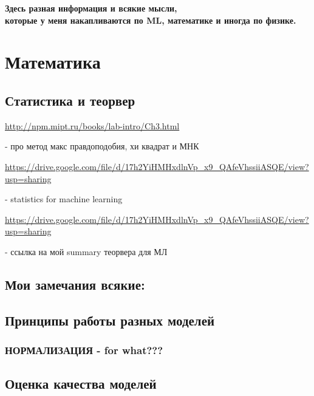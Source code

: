 \documentclass[11pt]{article}
\begin{document}
\begin{titlepage}
\begin{center}
\hspace{4.0cm}
\vfill

\huge\textbf{
    Здесь разная информация и всякие мысли,\\
    которые у меня накапливаются по ML, математике и 
    иногда по физике.
}

\vfill

\end{center}
\end{titlepage}

\tableofcontents

\newpage

\section{Математика}

\subsection{Статистика и теорвер}

\url{http://npm.mipt.ru/books/lab-intro/Ch3.html}

- про метод макс правдоподобия, хи квадрат и МНК

\url{https://drive.google.com/file/d/17h2YiHMHxdlnVp_x9_QAfeVhssiiASQE/view?usp=sharing}

- statistics for machine learning

\url{https://drive.google.com/file/d/17h2YiHMHxdlnVp_x9_QAfeVhssiiASQE/view?usp=sharing}

- ссылка на мой summary теорвера для МЛ

\subsection*{Мои замечания всякие:}



\subsection{Принципы работы разных моделей}

\subsubsection{НОРМАЛИЗАЦИЯ - for what???}

\subsection{Оценка качества моделей}
\end{document}
